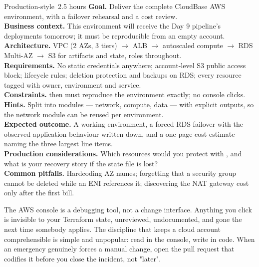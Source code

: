 \begin{minilab}{Production-style}{~2.5 hours}
\textbf{Goal.} Deliver the complete CloudBase AWS environment, with a failover rehearsal and a cost review.\\
\textbf{Business context.} This environment will receive the Day 9 pipeline's deployments tomorrow; it must be reproducible from an empty account.\\
\textbf{Architecture.} VPC (2 AZs, 3 tiers) $\rightarrow$ ALB $\rightarrow$ autoscaled compute $\rightarrow$ RDS Multi-AZ $\rightarrow$ S3 for artifacts and state, roles throughout.\\
\textbf{Requirements.} No static credentials anywhere; account-level S3 public access block; lifecycle rules; deletion protection and backups on RDS; every resource tagged with owner, environment and service.\\
\textbf{Constraints.}  then  must reproduce the environment exactly; no console clicks.\\
\textbf{Hints.} Split into modules --- network, compute, data --- with explicit outputs, so the network module can be reused per environment.\\
\textbf{Expected outcome.} A working environment, a forced RDS failover with the observed application behaviour written down, and a one-page cost estimate naming the three largest line items.\\
\textbf{Production considerations.} Which resources would you protect with , and what is your recovery story if the state file is lost?\\
\textbf{Common pitfalls.} Hardcoding AZ names; forgetting that a security group cannot be deleted while an ENI references it; discovering the NAT gateway cost only after the first bill.
\end{minilab}


\begin{opsnote}
The AWS console is a debugging tool, not a change interface. Anything you click is invisible to your Terraform state, unreviewed, undocumented, and gone the next time somebody applies. The discipline that keeps a cloud account comprehensible is simple and unpopular: read in the console, write in code. When an emergency genuinely forces a manual change, open the pull request that codifies it before you close the incident, not "later".
\end{opsnote}

